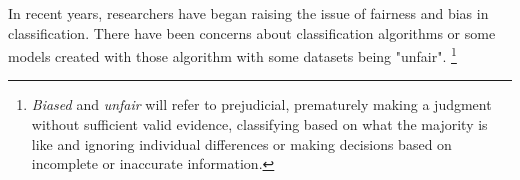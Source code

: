 \documentclass[a4paper, 12pt, titlepage]{article}
\begin{document}


In recent years, researchers have began raising the issue of fairness and bias in  classification. There have been concerns about classification algorithms or some models created with those algorithm with some datasets being "unfair". \footnote{\emph{Biased} and \emph{unfair} will refer to prejudicial, prematurely making a judgment without sufficient valid evidence, classifying based on what the majority is like and ignoring individual differences or making decisions based on incomplete or inaccurate information.}
\end{document}
